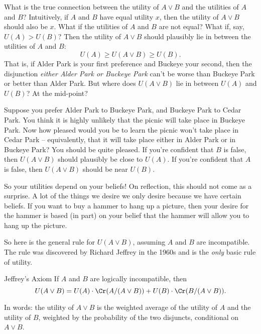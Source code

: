 What is the true connection between the utility of $A \lor B$ and the
utilities of $A$ and $B$? Intuitively, if $A$ and $B$ have equal
utility $x$, then the utility of $A \lor B$ should also be $x$. What
if the utilities of $A$ and $B$ are not equal? What if, say,
$U(A) > U(B)$?  Then the utility of $A \lor B$ should plausibly lie in
between the utilities of $A$ and $B$:
\[
  U(A) \geq U(A \lor B) \geq U(B).
\]
That is, if Alder Park is your first preference and Buckeye your second, then
the disjunction \emph{either Alder Park or Buckeye Park} can't be
worse than Buckeye Park or better than Alder Park. But where does $U(A
\lor B)$ lie in between $U(A)$ and $U(B)$? At the mid-point?

Suppose you prefer Alder Park to Buckeye Park, and Buckeye Park to
Cedar Park. You think it is highly unlikely that the picnic will take
place in Buckeye Park. Now how pleased would you be to learn the
picnic won't take place in Cedar Park -- equivalently, that it will
take place either in Alder Park or in Buckeye Park? You should be
quite pleased. If you're confident that $B$ is false, then
$U(A \lor B)$ should plausibly be close to $U(A)$. If you're confident
that $A$ is false, then $U(A \lor B)$ should be near $U(B)$.

So your utilities depend on your beliefs! On reflection, this should
not come as a surprise. A lot of the things we desire we only desire
because we have certain beliefs. If you want to buy a hammer to hang
up a picture, then your desire for the hammer is based (in part) on your belief
that the hammer will allow you to hang up the picture. 


So here is the general rule for $U(A \lor B)$, assuming $A$ and $B$
are incompatible. The rule was discovered by Richard Jeffrey in the
1960s and is the \emph{only} basic rule of utility.
%
\begin{genericthm}{Jeffrey's Axiom}
  If $A$ and $B$ are logically incompatible, then 
  \[ U(A \lor B) =
  U(A)\cdot \Cr(A/(A\lor B)) + U(B)\cdot \Cr(B/(A \lor B)). \]
\end{genericthm}
%
In words: the utility of $A \lor B$ is the weighted average of the
utility of $A$ and the utility of $B$, weighted by the probability of
the two disjuncts, conditional on $A \lor B$.

